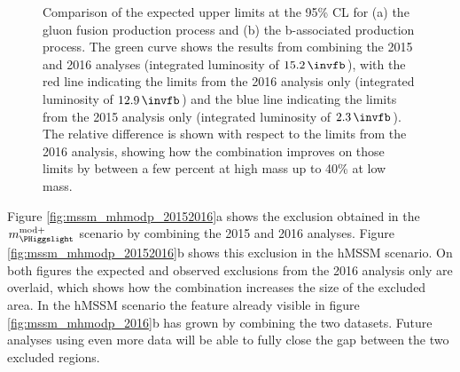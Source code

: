 \begin{figure}[h!]
\begin{center}
\end{center}
\caption[Comparison of the expected upper limits at the 95\% CL for the 
gluon fusion and b-associated production process, comparing the 2015 and 2016 analyses with a combination.]{Comparison of the expected upper limits at the 95\% \ac{CL} for (a) the gluon fusion production
process and (b) the b-associated production process. The green curve shows the results
from combining the 2015 and 2016 analyses (integrated luminosity of $15.2\,\invfb$),
with the red line indicating the limits from the 2016 analysis only (integrated luminosity of $12.9\,\invfb$)
and the blue line indicating the limits from the 2015 analysis only (integrated luminosity of $2.3\,\invfb$).
The relative difference is shown with respect to the limits from the 2016 analysis, showing how the combination
improves on those limits by between a few percent at high mass up to 40\% at low mass.}
\label{fig:mssm_results_combination_limits_comp}
\end{figure}

Figure \ref{fig:mssm_mhmodp_20152016}a shows the exclusion obtained in the $m_{\PHiggslight}^{\text{mod+}}$ 
scenario by combining the 2015 and 2016 analyses. Figure \ref{fig:mssm_mhmodp_20152016}b shows this exclusion
in the hMSSM scenario. On both figures the expected and observed exclusions from the
2016 analysis only are overlaid, which shows how the combination increases the
size of the excluded area. In the hMSSM scenario the feature already visible in figure \ref{fig:mssm_mhmodp_2016}b
has grown by combining the two datasets. Future analyses using even more data will be able to fully close
the gap between the two excluded regions.

